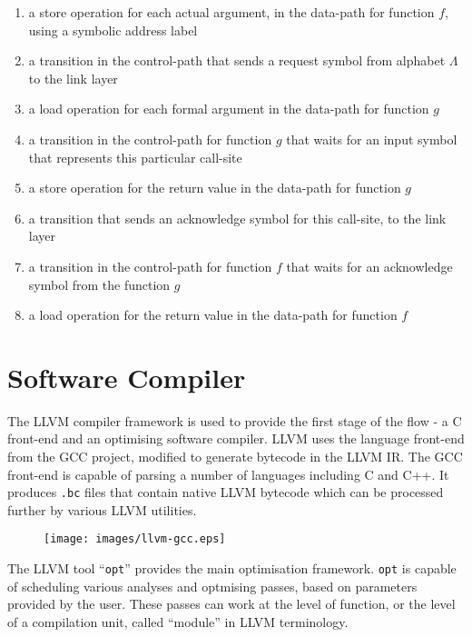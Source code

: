 \documentclass[12pt]{article}
\begin{document}
\begin{enumerate}
\item a store operation for each actual argument, in the data-path for
      function $f$, using a symbolic address label
\item a transition in the control-path that sends a request symbol
      from alphabet $\Lambda$ to the link layer
\item a load operation for each formal argument in the data-path for
      function $g$
\item a transition in the control-path for function $g$ that waits for
      an input symbol that represents this particular call-site
\item a store operation for the return value in the data-path for
      function $g$
\item a transition that sends an acknowledge symbol for this
      call-site, to the link layer
\item a transition in the control-path for function $f$ that waits for
      an acknowledge symbol from the function $g$
\item a load operation for the return value in the data-path for
      function $f$
\end{enumerate}

\section{Software Compiler}

The LLVM compiler framework is used to provide the first stage of the
flow - a C front-end and an optimising software compiler. LLVM uses
the language front-end from the GCC project, modified to generate
bytecode in the LLVM IR. The GCC front-end is capable of parsing a
number of languages including C and C++. It produces {\tt .bc} files
that contain native LLVM bytecode which can be processed further by
various LLVM utilities.

\begin{figure}[htb]
\centering
\texttt{[image: images/llvm-gcc.eps]}
\end{figure}

The LLVM tool ``{\tt opt}'' provides the main optimisation framework. 
{\tt opt} is capable of scheduling various analyses and optmising
passes, based on parameters provided by the user. These passes can
work at the level of function, or the level of a compilation unit,
called ``module'' in LLVM terminology.
\end{document}
